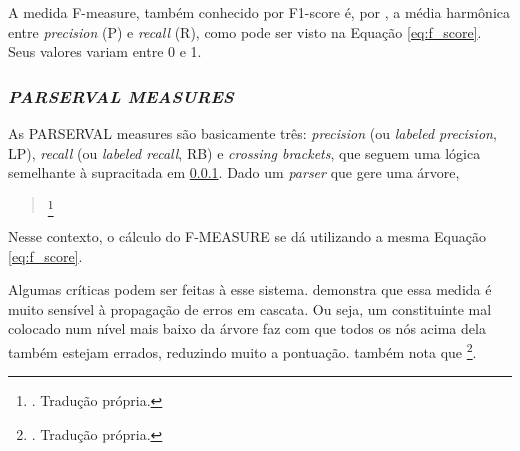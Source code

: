 A medida F-measure, também conhecido por F1-score \cite[p~262]{derczynski2016complementarity} é, por \cite[p~1]{truthFScore}, a média harmônica entre \textit{precision} (P) e \textit{recall} (R), como pode ser visto na Equação \ref{eq:f_score}. Seus valores variam entre 0 e 1. 
\begin{center}
    
\end{center}


\subsubsection{\textit{PARSERVAL MEASURES}}
\label{subsubsec:parseval}
As PARSERVAL measures são basicamente três: \textit{precision} (ou \textit{labeled precision}, LP), \textit{recall} (ou \textit{labeled recall}, RB) e \textit{crossing brackets}, que seguem uma lógica semelhante à supracitada em \ref{subsubsec:parseval}. Dado um \textit{parser} que gere uma árvore, \cite[p~433-434]{Manning1999FoundationsNLP}
\begin{quote}
    \footnote{. Tradução própria.}
\end{quote}
\begin{center}
    
\end{center}

Nesse contexto, o cálculo do F-MEASURE se dá utilizando a mesma Equação \ref{eq:f_score}.

Algumas críticas podem ser feitas à esse sistema.  demonstra que essa medida é muito sensível à propagação de erros em cascata. Ou seja, um constituinte mal colocado num nível mais baixo da árvore faz com que todos os nós acima dela também estejam errados, reduzindo muito a pontuação.  também nota que 
\footnote{. Tradução própria.}.

